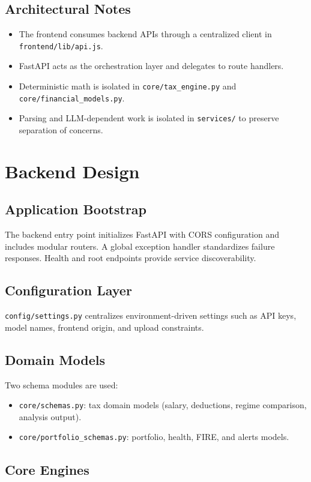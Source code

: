 \documentclass[12pt,a4paper]{article}
\begin{document}
\subsection{Architectural Notes}
\begin{itemize}
	\item The frontend consumes backend APIs through a centralized client in \texttt{frontend/lib/api.js}.
	\item FastAPI acts as the orchestration layer and delegates to route handlers.
	\item Deterministic math is isolated in \texttt{core/tax\_engine.py} and \texttt{core/financial\_models.py}.
	\item Parsing and LLM-dependent work is isolated in \texttt{services/} to preserve separation of concerns.
\end{itemize}

\section{Backend Design}
\subsection{Application Bootstrap}
The backend entry point initializes FastAPI with CORS configuration and includes modular routers. A global exception handler standardizes failure responses. Health and root endpoints provide service discoverability.

\subsection{Configuration Layer}
\texttt{config/settings.py} centralizes environment-driven settings such as API keys, model names, frontend origin, and upload constraints.

\subsection{Domain Models}
Two schema modules are used:
\begin{itemize}
	\item \texttt{core/schemas.py}: tax domain models (salary, deductions, regime comparison, analysis output).
	\item \texttt{core/portfolio\_schemas.py}: portfolio, health, FIRE, and alerts models.
\end{itemize}

\subsection{Core Engines}
\end{document}
